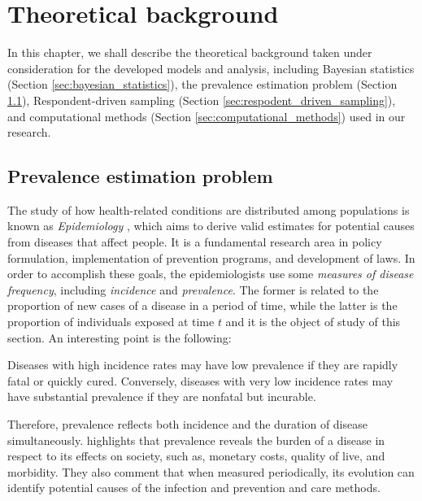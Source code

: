 \chapter{Theoretical background}
\label{ch:theoretical-background}

In this chapter, we shall describe the theoretical background
taken under consideration for the developed models and analysis, including
Bayesian statistics (Section \ref{sec:bayesian_statistics}), the prevalence 
estimation problem (Section \ref{sec:prevalence_estimation_problem}), 
Respondent-driven sampling (Section \ref{sec:respodent_driven_sampling}), 
and computational methods (Section
\ref{sec:computational_methods}) used in our research. 

\section{Prevalence estimation problem}
\label{sec:prevalence_estimation_problem}

The study of how health-related conditions are distributed among populations
is known as {\em Epidemiology} \cite[p. 32]{rothman2008modern}, which aims to derive valid estimates for
potential causes from diseases that affect people. It is a fundamental
research area in policy formulation, implementation of prevention programs,
and development of laws. In order to accomplish these goals, the
epidemiologists use some {\em measures of disease frequency}, including {\em
incidence} and {\em prevalence}. The former is related to the proportion of
new cases of a disease in a period of time, while the latter is the proportion
of individuals exposed at time $t$ and it is the object of
study of this section. An interesting point is the following:

\begin{citacao}
  Diseases with high incidence rates may have low prevalence if they are rapidly fatal or quickly cured. Conversely, diseases with very low incidence
  rates may have substantial prevalence if they are nonfatal but incurable.
  \cite[p. 46]{rothman2008modern}
\end{citacao}

Therefore, prevalence reflects both incidence and the duration of disease
simultaneously. \textcite[p. c18]{noordzij2010measures} highlights that
prevalence reveals the burden of a disease in respect to its effects on
society, such as, monetary costs, quality of live, and morbidity. They also
comment that when measured periodically, its evolution can identify potential
causes of the infection and prevention and care methods. 

